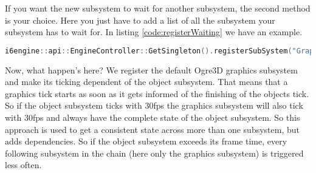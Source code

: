 \documentclass{article}
\begin{document}
If you want the new subsystem to wait for another subsystem, the second method is your choice. Here you just have to add a list of all the subsystem your subsystem has to wait for. In listing \ref{code:registerWaiting} we have an example.

\begin{lstlisting}[language=C++, style=basic, caption={registering graphics subsystem waiting for object subsystem}, label=code:registerWaiting]
i6engine::api::EngineController::GetSingleton().registerSubSystem("Graphic", new i6engine::modules::GraphicsController(), { i6engine::core::Subsystem::Object });
\end{lstlisting}

Now, what happen's here? We register the default Ogre3D graphics subsystem and make its ticking dependent of the object subsystem. That means that a graphics tick starts as soon as it gets informed of the finishing of the objects tick. So if the object subsystem ticks with 30fps the graphics subsystem will also tick with 30fps and always have the complete state of the object subsystem. So this approach is used to get a consistent state across more than one subsystem, but adds dependencies. So if the object subsystem exceeds its frame time, every following subsystem in the chain (here only the graphics subsystem) is triggered less often.
\end{document}
